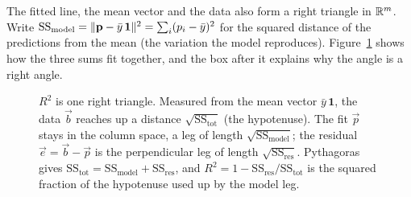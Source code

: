 The fitted line, the mean vector and the data also form a right triangle in $\mathbb{R}^m$. Write
$\mathrm{SS_{model}}=\lVert\mathbf{p}-\bar{y}\,\mathbf{1}\rVert^2=\sum_i(p_i-\bar{y})^2$ for the squared
distance of the predictions from the mean (the variation the model reproduces).
Figure~\ref{ch19:rsquared-triangle} shows how the three sums fit together, and the box after it
explains why the angle is a right angle.

\begin{figure}[H]
\centering
{}
\caption{$R^2$ is one right triangle. Measured from the mean vector $\bar{y}\,\mathbf{1}$, the data
$\vec{b}$ reaches up a distance $\sqrt{\mathrm{SS_{tot}}}$ (the hypotenuse). The fit $\vec{p}$ stays
in the column space, a leg of length $\sqrt{\mathrm{SS_{model}}}$; the residual $\vec{e}=\vec{b}
-\vec{p}$ is the perpendicular leg of length $\sqrt{\mathrm{SS_{res}}}$. Pythagoras gives
$\mathrm{SS_{tot}}=\mathrm{SS_{model}}+\mathrm{SS_{res}}$, and $R^2=1-\mathrm{SS_{res}}/
\mathrm{SS_{tot}}$ is the squared fraction of the hypotenuse used up by the model leg.}
\label{ch19:rsquared-triangle}
\end{figure}

